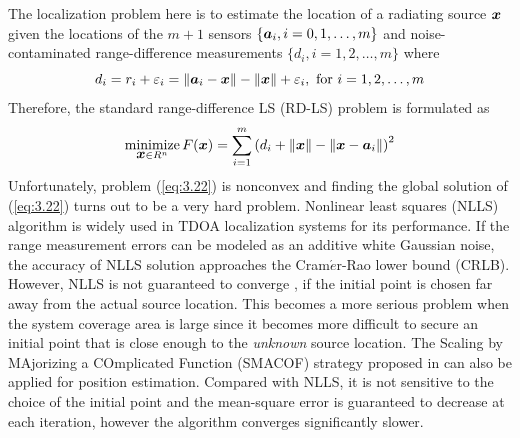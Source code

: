 The localization problem here is to estimate the location of a radiating source $\mbox{\boldmath$x$}$ given the locations of the $m+1$ sensors $\{\mbox{\boldmath$a$}_i, i = 0, 1, \ldots, m\}$ and noise-contaminated range-difference measurements $\{d_i, i = 1, 2, \ldots, m\}$ where 
\begin{equation} \label{eq:3.21}
d_i = r_i + \varepsilon_i = \|\mbox{\boldmath$a$}_i - \mbox{\boldmath$x$}\| - \|\mbox{\boldmath$x$}\| + \varepsilon_i, \mbox{ for } i = 1, 2, \ldots, m
\end{equation}
Therefore, the standard range-difference LS (RD-LS) problem is formulated as
 \begin{equation} \label{eq:3.22}
\mathop{\mbox{minimize}}_{\mbox{\boldmath$x$} \in R^n} F(\mbox{\boldmath$x$})=\sum_{i=1}^m \left(d_i+\|\mbox{\boldmath$x$}\|-\|\mbox{\boldmath$x$}-\mbox{\boldmath$a$}_i\|\right)^2
 \end{equation}
 Unfortunately, problem (\ref{eq:3.22}) is nonconvex and finding the global solution of (\ref{eq:3.22}) turns out to be a very hard problem. Nonlinear least squares (NLLS) algorithm  \cite{KimLeJe} is widely used in TDOA localization systems for its performance. If  the range  measurement  errors  can  be  modeled  as  an  additive white  Gaussian  noise,  the  accuracy  of  NLLS solution approaches  the Cram$\acute{e}$r-Rao  lower  bound  (CRLB). However, NLLS is not guaranteed to converge  \cite{Chan}, \cite{KimLeJe} if the initial point is chosen far away from the actual source location. This becomes a more serious problem when the system coverage area is large since it becomes more difficult to secure an initial point that is close enough to the \textit{unknown} source location. The Scaling by  MAjorizing  a  COmplicated  Function  (SMACOF)  strategy proposed in \cite{SMAC} can also be applied for position estimation. Compared with NLLS, it is not sensitive to the choice of the initial point and the mean-square error is guaranteed to decrease at each iteration, however the algorithm  converges significantly slower.	
